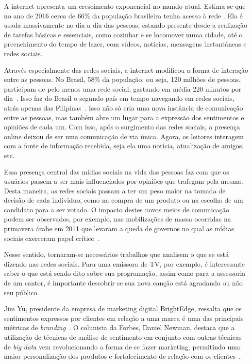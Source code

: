 
A internet apresenta um crescimento exponencial no mundo atual.
Estima-se que no ano de 2016 cerca de 66\% da população brasileira tenha acesso à rede \cite{social17}.
Ela é usada massivamente no dia a dia das pessoas, estando presente desde a realização de tarefas básicas e essenciais,
como cozinhar e se locomover numa cidade, até o preenchimento do tempo de lazer, com vídeos, notícias, mensagens
instantâneas e redes sociais.

Através especialmente das redes sociais, a internet modificou a forma de interação entre as pessoas.
No Brasil, 58\% da população, ou seja, 120 milhões de pessoas, participam de pelo menos uma rede social, gastando em
média 220 minutos por dia~\cite{social17}.
Isso faz do Brasil o segundo país em tempo navegando em redes sociais, atrás apenas das Filipinas~\cite{social17}.
Isso não só cria uma nova instância de comunicação entre as pessoas, mas também abre um lugar para a expressão dos
sentimentos e opiniões de cada um.
Com isso, após o surgimento das redes sociais, a presença online deixou de ser uma comunicação de via única.
Agora, os leitores interagem com a fonte de informação recebida, seja ela uma notícia, atualização de amigos, etc.

Essa presença central das mídias sociais na vida das pessoas faz com que os usuários passem a ser mais influenciados
por opiniões que trafegam pela mesma.
Desta maneira, as redes sociais passam a ter um peso maior na tomada de decisão de cada individuo, como na compra de
um produto ou na escolha de um candidato para a ser votado.
O impacto destes novos meios de comunicação podem ser observados, por exemplo, nas mobilizações de massa ocorridas na
primavera árabe em 2011 que levaram a queda de governos no qual as mídias sociais exerceram papel
crítico~\cite{mourtada11}.

Nesse sentido, tornaram-se necessários trabalhos que analisem o que se está dizendo nas redes sociais.
Para uma emissora de TV, por exemplo, é interessante saber o que está sendo dito sobre sua programação, assim como para
a assessoria de um cantor, é importante descobrir se sua nova canção está agradando ou não seu público.

Jim Yu, presidente da empresa de marketing digital BrightEdge, ressalta que os sentimentos expressos por clientes em
relação a uma marca é uma das principais métricas de \textit{branding}~\cite{marketingland}.
O colunista da Forbes, Daniel Newman, destaca que a utilização de técnicas de análise de sentimento em conjunto com
outras técnicas de \textit{big data} vem revolucionando a forma de se fazer marketing, permitindo uma maior
personalização dos produtos e fortalecimento de relação com os clientes~\cite{newman16}.

